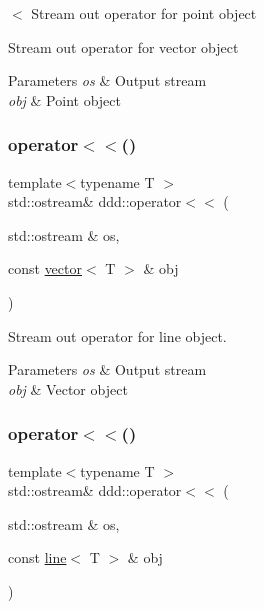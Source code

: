 $<$ Stream out operator for point object 

Stream out operator for vector object 
\begin{DoxyParams}{Parameters}
{\em os} & Output stream \\
\hline
{\em obj} & Point object \\
\hline
\end{DoxyParams}
\mbox{\label{namespaceddd_a85783ffbd6985b1981059732d7bbe174}} 
\subsubsection{\texorpdfstring{operator$<$$<$()}{operator<<()}\hspace{0.1cm}{\footnotesize\ttfamily [2/10]}}
{\footnotesize\ttfamily template$<$typename T $>$ \\
std\+::ostream\& ddd\+::operator$<$$<$ (\begin{DoxyParamCaption}\item[{std\+::ostream \&}]{os,  }\item[{const \hyperlink{classddd_1_1vector}{vector}$<$ T $>$ \&}]{obj }\end{DoxyParamCaption})\hspace{0.3cm}{\ttfamily [inline]}}



Stream out operator for line object. 


\begin{DoxyParams}{Parameters}
{\em os} & Output stream \\
\hline
{\em obj} & Vector object \\
\hline
\end{DoxyParams}
\mbox{\label{namespaceddd_a2001eec5d960802592e1ca6a5b0dc203}} 
\subsubsection{\texorpdfstring{operator$<$$<$()}{operator<<()}\hspace{0.1cm}{\footnotesize\ttfamily [3/10]}}
{\footnotesize\ttfamily template$<$typename T $>$ \\
std\+::ostream\& ddd\+::operator$<$$<$ (\begin{DoxyParamCaption}\item[{std\+::ostream \&}]{os,  }\item[{const \hyperlink{classddd_1_1line}{line}$<$ T $>$ \&}]{obj }\end{DoxyParamCaption})\hspace{0.3cm}{\ttfamily [inline]}}



